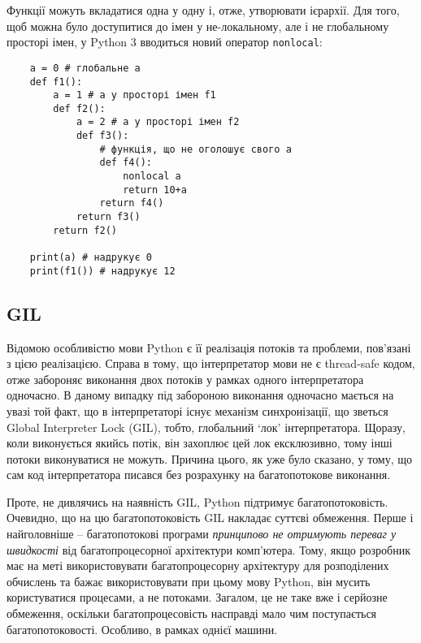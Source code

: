 \documentclass[a4paper, 12pt, onsedie]{article}
\begin{document}
    Функції можуть вкладатися одна у одну і, отже, утворювати ієрархії. Для того, щоб можна було
    доступитися до імен у не-локальному, але і не глобальному просторі імен, у Python 3 вводиться
    новий оператор \texttt{nonlocal}:
    \begin{verbatim}
    a = 0 # глобальне a
    def f1():
        a = 1 # a у просторі імен f1
        def f2():
            a = 2 # a у просторі імен f2
            def f3():
                # функція, що не оголошує свого a
                def f4():
                    nonlocal a
                    return 10+a
                return f4()
            return f3()
        return f2()

    print(a) # надрукує 0
    print(f1()) # надрукує 12
    \end{verbatim}

\subsection{GIL}
    Відомою особливістю мови Python є її реалізація потоків та проблеми, пов'язані з цією
    реалізацією. Справа в тому, що інтерпретатор мови не є thread-safe кодом, отже забороняє
    виконання двох потоків у рамках одного інтерпретатора одночасно. В даному випадку під
    забороною виконання одночасно мається на увазі той факт, що в інтерпретаторі існує
    механізм синхронізації, що зветься Global Interpreter Lock (GIL), тобто, глобальний `лок'
    інтерпретатора. Щоразу, коли виконується якийсь потік, він захоплює цей лок ексклюзивно,
    тому інші потоки виконуватися не можуть. Причина цього, як уже було сказано, у тому, що
    сам код інтерпретатора писався без розрахунку на багатопотокове виконання. 

    Проте, не дивлячись на наявність GIL, Python підтримує багатопотоковість. Очевидно, що
    на цю багатопотоковість GIL накладає суттєві обмеження. Перше і найголовніше -- 
    багатопотокові програми \emph{принципово не отримують переваг у швидкості}
    від багатопроцесорної архітектури комп'ютера. Тому, якщо розробник має на меті 
    використовувати багатопроцесорну архітектуру для розподілених обчислень та бажає
    використовувати при цьому мову Python, він мусить користуватися процесами, а не потоками.
    Загалом, це не таке вже і серйозне обмеження, оскільки багатопроцесовість насправді мало
    чим поступається багатопотоковості. Особливо, в рамках однієї машини.
\end{document}
